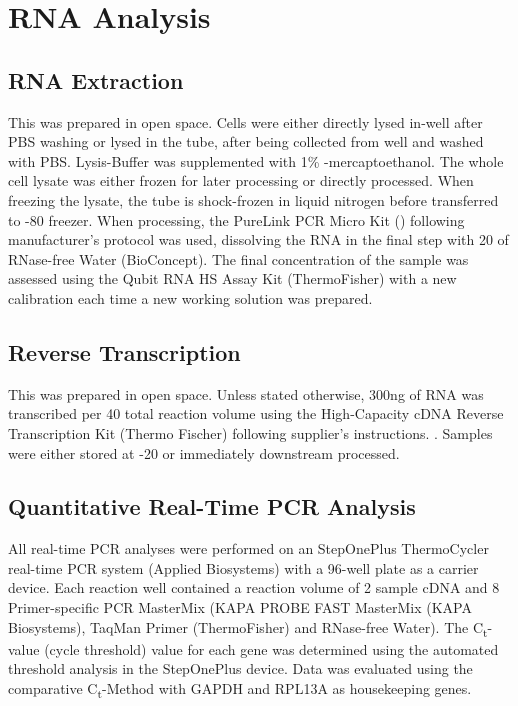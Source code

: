 \section{RNA Analysis}
\subsection{RNA Extraction}
This was prepared in open space. Cells were either directly lysed in-well after PBS washing or lysed in the tube, after being collected from well and washed with PBS. Lysis-Buffer was supplemented with 1\% \textbeta-mercaptoethanol. The whole cell lysate was either frozen for later processing or directly processed. When freezing the lysate, the tube is shock-frozen in liquid nitrogen before transferred to -80 \degC freezer. When processing, the PureLink PCR Micro Kit () following manufacturer's protocol was used, dissolving the RNA in the final step with 20\mul{} of RNase-free Water (BioConcept). The final concentration of the sample was assessed using the Qubit RNA HS Assay Kit (ThermoFisher) with a new calibration each time a new working solution was prepared.

\subsection{Reverse Transcription}
This was prepared in open space. Unless stated otherwise, 300ng of RNA was transcribed per 40\mul{} total reaction volume using the High-Capacity cDNA Reverse Transcription Kit (Thermo Fischer) following supplier's instructions. . Samples were either stored at -20 \degC or immediately downstream processed. 

\subsection{Quantitative Real-Time PCR Analysis}
All real-time PCR analyses were performed on an StepOnePlus ThermoCycler real-time PCR system (Applied Biosystems) with a 96-well plate as a carrier device. Each reaction well contained a reaction volume of 2\mul{} sample cDNA and 8\mul{} Primer-specific PCR MasterMix (KAPA PROBE FAST MasterMix (KAPA Biosystems), TaqMan\textregistered{} Primer (ThermoFisher) and RNase-free Water). The C\textsubscript{t}-value (cycle threshold) value for each gene was determined using the automated threshold analysis in the StepOnePlus device. Data was evaluated using the comparative C\textsubscript{t}-Method with GAPDH and RPL13A as housekeeping genes.

